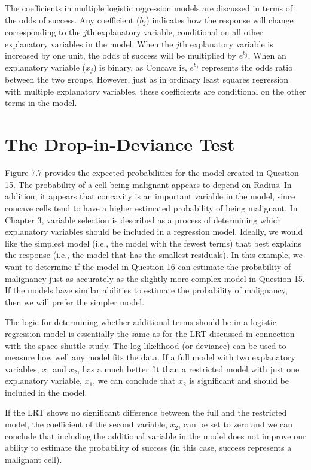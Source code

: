 \documentclass[
]{report}
\begin{document}
The coefficients in multiple logistic regression models are discussed in terms of the odds of success. Any coefficient (\(b_j\)) indicates how the response will change corresponding to the \(j\)th explanatory variable, conditional on all other explanatory variables in the model. When the \(j\)th explanatory variable is increased by one unit, the odds of success will be multiplied by \(e^{b_j}\). When an explanatory variable (\(x_j\)) is binary, as Concave is, \(e^{b_j}\) represents the odds ratio between the two groups. However, just as in ordinary least squares regression with multiple explanatory variables, these coefficients are conditional on the other terms in the model.

\section{\texorpdfstring{\textbf{The Drop-in-Deviance Test}}{The Drop-in-Deviance Test}}\label{the-drop-in-deviance-test}

Figure 7.7 provides the expected probabilities for the model created in Question 15. The probability of a cell being malignant appears to depend on Radius. In addition, it appears that concavity is an important variable in the model, since concave cells tend to have a higher estimated probability of being malignant. In Chapter 3, variable selection is described as a process of determining which explanatory variables should be included in a regression model. Ideally, we would like the simplest model (i.e., the model with the fewest terms) that best explains the response (i.e., the model that has the smallest residuals). In this example, we want to determine if the model in Question 16 can estimate the probability of malignancy just as accurately as the slightly more complex model in Question 15. If the models have similar abilities to estimate the probability of malignancy, then we will prefer the simpler model.

The logic for determining whether additional terms should be in a logistic regression model is essentially the same as for the LRT discussed in connection with the space shuttle study. The log-likelihood (or deviance) can be used to measure how well any model fits the data. If a full model with two explanatory variables, \(x_1\) and \(x_2\), has a much better fit than a restricted model with just one explanatory variable, \(x_1\), we can conclude that \(x_2\) is significant and should be included in the model.

If the LRT shows no significant difference between the full and the restricted model, the coefficient of
the second variable, \(x_2\), can be set to zero and we can conclude that including the additional variable in the
model does not improve our ability to estimate the probability of success (in this case, success represents a
malignant cell).
\end{document}
